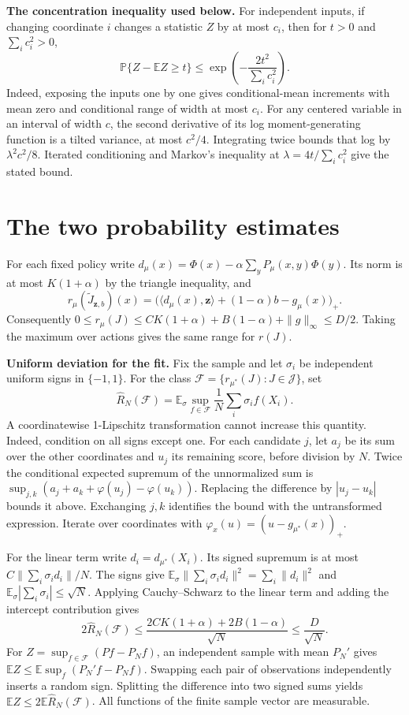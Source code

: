 \documentclass[12pt,a4paper]{article}
\newcommand{\E}{\mathbb E}
\newcommand{\Prob}{\mathbb P}
\newcommand{\lead}[1]{\par\smallskip\noindent\textbf{#1}\enspace}
\newcommand{\class}{\mathcal J}
\begin{document}
\lead{The concentration inequality used below.}
For independent inputs, if changing coordinate \(i\) changes a statistic
\(Z\) by at most \(c_i\), then for \(t>0\) and \(\sum_i c_i^2>0\),
\[
 \Prob\{Z-\E Z\ge t\}\le\exp\!\left(-\frac{2t^2}{\sum_i c_i^2}\right).
\]
Indeed, exposing the inputs one by one gives conditional-mean increments
with mean zero and conditional range of width at most \(c_i\). For any
centered variable in an interval of width \(c\), the second derivative
of its log moment-generating function is a tilted variance, at most
\(c^2/4\). Integrating twice bounds that log by \(\lambda^2 c^2/8\).
Iterated conditioning and Markov's inequality at
\(\lambda=4t/\sum_i c_i^2\) give the stated bound.

\newpage
\section*{The two probability estimates}
For each fixed policy write \(d_\mu(x)=\Phi(x)-\alpha\sum_yP_\mu(x,y)\Phi(y)\).
Its norm is at most \(K(1+\alpha)\) by the triangle inequality, and
\[
 r_\mu(\widetilde J_{\mathbf z,b})(x)
   =\bigl(\langle d_\mu(x),\mathbf z\rangle+(1-\alpha)b-g_\mu(x)\bigr)_+ .
\]
Consequently \(0\le r_\mu(J)\le CK(1+\alpha)+B(1-\alpha)+\|g\|_\infty\le D/2\).
Taking the maximum over actions gives the same range for \(r(J)\).

\lead{Uniform deviation for the fit.}
Fix the sample and let \(\sigma_i\) be independent uniform signs in
\(\{-1,1\}\). For the class \(\mathcal F=\{r_{\mu^*}(J):J\in\class\}\), set
\[
 \widehat R_N(\mathcal F)=
 \E_\sigma\sup_{f\in\mathcal F}\frac1N\sum_i\sigma_i f(X_i).
\]
A coordinatewise 1-Lipschitz transformation cannot increase this quantity.
Indeed, condition on all signs except one. For each candidate \(j\), let
\(a_j\) be its sum over the other coordinates and \(u_j\) its remaining
score, before division by \(N\). Twice the conditional expected supremum of the
unnormalized sum is
\(\sup_{j,k}(a_j+a_k+\varphi(u_j)-\varphi(u_k))\).
Replacing the difference by \(|u_j-u_k|\) bounds it above. Exchanging
\(j,k\) identifies the bound with the untransformed expression. Iterate
over coordinates with \(\varphi_x(u)=(u-g_{\mu^*}(x))_+\).

For the linear term write \(d_i=d_{\mu^*}(X_i)\).
Its signed supremum is at most \(C\|\sum_i\sigma_i d_i\|/N\).
The signs give \(\E_\sigma\|\sum_i\sigma_i d_i\|^2=\sum_i\|d_i\|^2\)
and \(\E_\sigma|\sum_i\sigma_i|\le\sqrt N\). Applying Cauchy--Schwarz
to the linear term and adding the intercept contribution gives
\[
 2\widehat R_N(\mathcal F)
 \le \frac{2CK(1+\alpha)+2B(1-\alpha)}{\sqrt N}\le\frac{D}{\sqrt N}.
\]
For \(Z=\sup_{f\in\mathcal F}(Pf-P_N f)\), an independent sample with mean
\(P_N'\) gives \(\E Z\le\E\sup_f(P_N'f-P_N f)\). Swapping each pair of
observations independently inserts a random sign. Splitting the difference
into two signed sums yields \(\E Z\le2\E\widehat R_N(\mathcal F)\).
All functions of the finite sample vector are measurable.
\end{document}
